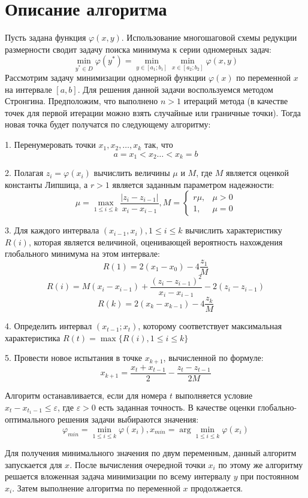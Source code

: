 \documentclass{report}
\begin{document}
\section*{Описание алгоритма}
Пусть задана функция $\varphi(x, y)$. Использование многошаговой схемы редукции размерности сводит задачу поиска минимума к серии одномерных задач:
$$\min\limits_{y^* \in D}\varphi(y^*) = \min\limits_{y \in [a_1; b_1]} \min\limits_{x \in [a_2; b_2]}\varphi(x, y)$$
Рассмотрим задачу минимизации одномерной функции $\varphi(x)$ по переменной $x$ на интервале $[a, b]$. Для решения данной задачи воспользуемся методом Стронгина. Предположим, что выполнено $n>1$ итераций метода (в качестве точек для первой итерации можно взять случайные или граничные точки). Тогда новая точка будет получатся по следующему алгоритму:
\par 1. Перенумеровать точки $x_1, x_2, \ldots, x_k$ так, что
$$ a = x_1 < x_2 \ldots < x_k = b$$
\par 2. Полагая $z_i = \varphi(x_i)$ вычислить величины $\mu$ и $M$, где $M$ является оценкой константы Липшица, а $r>1$ является заданным параметром надежности:
$$\mu = \max\limits_{1 \leq i \leq k} \frac{|z_i - z_{i-1}|}{x_i - x_{i-1}}, M = \begin{cases} r\mu, & \mu > 0 \\ 1, & \mu=0 \end{cases} $$
\par 3. Для каждого интервала $(x_{i-1}, x_i), 1 \leq i \leq k$ вычислить характеристику $R(i)$, которая является величиной, оценивающей вероятность нахождения глобального минимума на этом интервале:
$$ R(1) = 2(x_1 - x_0) - 4 \frac{z_1}{M}$$
$$ R(i) = M(x_i - x_{i-1}) + \frac{(z_i - z_{i-1})^2}{x_i - x_{i-1}} - 2(z_i - z_{i-1})$$
$$ R(k) = 2(x_k - x_{k-1}) - 4 \frac{z_k}{M}$$
\par 4. Определить интервал $(x_{t-1}; x_t)$, которому соответствует максимальная характеристика $R(t) = \max \{R(i), 1 \leq i \leq k \}$
\par 5. Провести новое испытания в точке $x_{k+1}$, вычисленной по формуле:
$$ x_{k+1} = \frac{x_t + x_{t - 1}}{2} - \frac{z_t - z_{t - 1}}{2M}$$
\par Алгоритм останавливается, если для номера $t$ выполняется условие $x_t - x_{t_1 - 1} \leq \varepsilon$, где $\varepsilon>0$ есть заданная точность. В качестве оценки глобально-оптимального решения задачи выбираются значения:
$$\varphi_{min} = \min\limits_{1 \leq i \leq k}\varphi(x_i), x_{min} = \arg{\min\limits_{1 \leq i \leq k}\varphi(x_i)}$$
\par Для получения минимального значения по двум переменным, данный алгоритм запускается для $x$. После вычисления очередной точки $x_i$ по этому же алгоритму решается вложенная задача минимизации по всему интервалу $y$  при постоянном $x_i$. Затем выполнение алгоритма по переменной $x$ продолжается.
\end{document}
